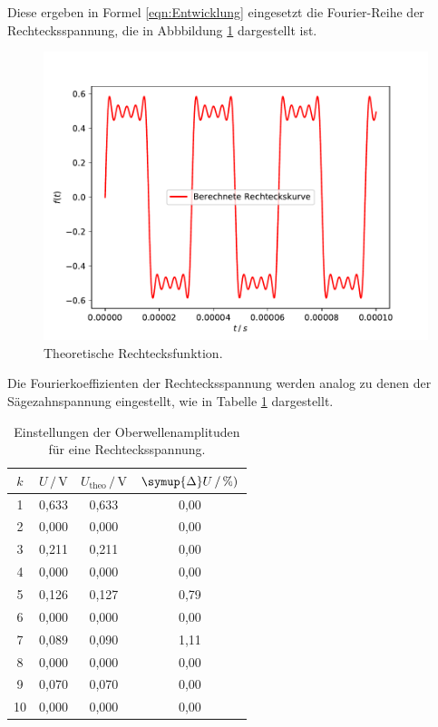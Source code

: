 Diese ergeben in Formel \eqref{eqn:Entwicklung} eingesetzt die Fourier-Reihe
der Rechtecksspannung, die in Abbbildung \ref{fig:Theo2}  dargestellt ist.

\begin{figure}[H]
    \centering
    \includegraphics[scale = 0.6]{content/plot5.pdf}
    \caption{Theoretische Rechtecksfunktion.}
    \label{fig:Theo2}
\end{figure}

Die Fourierkoeffizienten der Rechtecksspannung werden analog zu denen der Sägezahnspannung
eingestellt, wie in Tabelle \ref{tab:Messdaten5} dargestellt. 

\begin{table}[H]
    \centering
    \caption{Einstellungen der Oberwellenamplituden für eine Rechtecksspannung.}
    \label{tab:Messdaten5}
    \begin{tabular}{c c c c}
    \toprule
    $k$ & $U \,/\, \si{\volt}$ & $U_\text{theo} \,/\, \si{\volt}$ & $\symup{\Delta}U \,/\, \si{\percent})$ \\
    \midrule
     1 & 0,633 & 0,633 & 0,00 \\
     2 & 0,000 & 0,000 & 0,00 \\
     3 & 0,211 & 0,211 & 0,00 \\
     4 & 0,000 & 0,000 & 0,00 \\
     5 & 0,126 & 0,127 & 0,79 \\
     6 & 0,000 & 0,000 & 0,00 \\
     7 & 0,089 & 0,090 & 1,11 \\
     8 & 0,000 & 0,000 & 0,00 \\
     9 & 0,070 & 0,070 & 0,00 \\
    10 & 0,000 & 0,000 & 0,00 \\
    \bottomrule
    \end{tabular}
\end{table}


